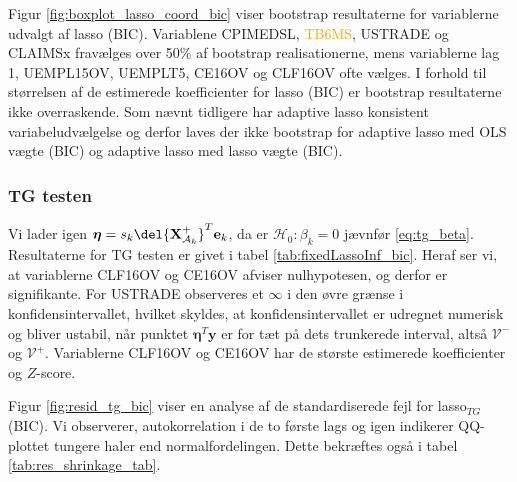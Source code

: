 Figur \ref{fig:boxplot_lasso_coord_bic} viser bootstrap resultaterne for variablerne udvalgt af lasso (BIC).
Variablene \textcolor{cadetblue2}{CPIMEDSL}, \textcolor{orange}{TB6MS}, \textcolor{blue3}{USTRADE} og \textcolor{blue3}{CLAIMSx} fravælges over 50\% af bootstrap realisationerne, mens variablerne \textcolor{blue3}{lag 1}, \textcolor{blue3}{UEMPL15OV}, \textcolor{blue3}{UEMPLT5}, \textcolor{blue3}{CE16OV} og \textcolor{blue3}{CLF16OV} ofte vælges.
I forhold til størrelsen af de estimerede koefficienter for lasso (BIC) er bootstrap resultaterne ikke overraskende. 
Som nævnt tidligere har adaptive lasso konsistent variabeludvælgelse og derfor laves der ikke bootstrap for adaptive lasso med OLS vægte (BIC) og adaptive lasso med lasso vægte (BIC). 

\subsubsection{TG testen}
Vi lader igen $\boldsymbol{\eta} = s_k \del{\textbf{X}^+_{\mathcal{A}_k}}^T \mathbf{e}_k$, da er $\mathcal{H}_0: \beta_k = 0$ jævnfør \eqref{eq:tg_beta}. 
Resultaterne for TG testen er givet i tabel \ref{tab:fixedLassoInf_bic}.
Heraf ser vi, at variablerne \textcolor{blue3}{CLF16OV} og \textcolor{blue3}{CE16OV} afviser nulhypotesen, og derfor er signifikante.
For \textcolor{blue3}{USTRADE} observeres et $\infty$ i den øvre grænse i konfidensintervallet, hvilket skyldes, at konfidensintervallet er udregnet numerisk og bliver ustabil, når punktet $\boldsymbol\eta^T \mathbf{y}$ er for tæt på dets trunkerede interval, altså $\mathcal{V}^-$ og $\mathcal{V}^+$. 
Variablerne \textcolor{blue3}{CLF16OV} og \textcolor{blue3}{CE16OV} har de største estimerede koefficienter og $Z$-score.

Figur \ref{fig:resid_tg_bic} viser en analyse af de standardiserede fejl for lasso$_{TG}$ (BIC). 
Vi observerer, autokorrelation i de to første lags og igen indikerer QQ-plottet tungere haler end normalfordelingen. 
Dette bekræftes også i tabel \ref{tab:res_shrinkage_tab}.




